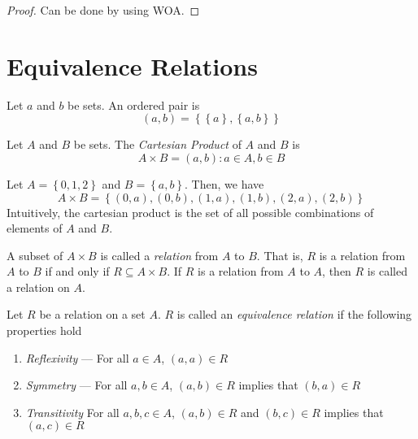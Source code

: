 \begin{proof}
    Can be done by using WOA.
\end{proof}

\section{Equivalence Relations}

\begin{definition}
    Let \(a\) and \(b\) be sets. An ordered pair is
    \[
        (a, b) = \left\{\left\{a\right\}, \left\{a, b\right\}\right\}
    \]
\end{definition}

\begin{definition}
    Let \(A\) and \(B\) be sets. The \textit{Cartesian Product} of \(A\) and \(B\) is
    \[
        A \times B = {(a, b) : a \in A, b \in B}
    \]
\end{definition}

\begin{nexample}
    Let \(A = \left\{0, 1, 2\right\}\) and \(B = \left\{a, b\right\}\). Then, we have
    \[
        A \times B = \left\{(0, a), (0, b), (1, a), (1, b), (2, a), (2, b)\right\}
    \]
    Intuitively, the cartesian product is the set of all possible combinations of elements of \(A\) and \(B\).
\end{nexample}

\begin{definition}[Relation]
    A subset of \(A \times B\) is called a \textit{relation} from \(A\) to \(B\). That is, \(R\) is a relation from \(A\) to \(B\) if and only if \(R \subseteq A \times B\). If \(R\) is a relation from \(A\) to \(A\), then \(R\) is called a relation on \(A\).
\end{definition}

\begin{definition}
    Let \(R\) be a relation on a set \(A\). \(R\) is called an \textit{equivalence relation} if the following properties hold
    \begin{enumerate}
        \item \textit{Reflexivity} --- For all \(a \in A\), \((a, a) \in R\)
        \item \textit{Symmetry} --- For all \(a, b \in A\), \((a, b) \in R\) implies that \((b, a) \in R\)
        \item \textit{Transitivity} For all \(a, b, c \in A\), \((a, b) \in R\) and \((b, c) \in R\) implies that \((a, c) \in R\)
    \end{enumerate}
\end{definition}

